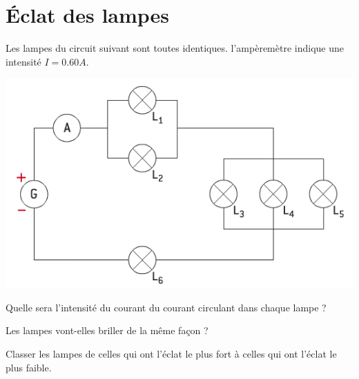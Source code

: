 \section{\'Eclat des lampes}

Les lampes du circuit suivant sont toutes identiques. l'ampèremètre indique une intensité $I = \num{0.60} A.$

\begin{center}
	\includegraphics[scale=0.6]{img/ex_16}
\end{center}

\begin{questions}
	\question Quelle sera l'intensité du courant du courant circulant dans chaque lampe ?
	\fillwithdottedlines{3cm}
	
	\question Les lampes vont-elles briller de la même façon ?
	\fillwithdottedlines{2cm}
	
	\question Classer les lampes de celles qui ont l'éclat le plus fort à celles qui ont l'éclat le plus faible.
	\fillwithdottedlines{2cm}
	
\end{questions}